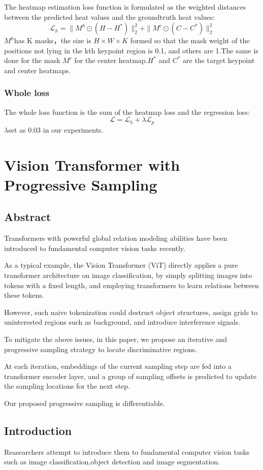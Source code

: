 \documentclass[11pt]{article}
\begin{document}
The heatmap estimation loss function is formulated as the weighted distances between the predicted heat values and the groundtruth heat values:
$$\mathcal{L}_h = \parallel M^h \odot (H - H^*)\parallel^2_2 + \parallel M^c \odot (C - C^*)\parallel^2_2$$
$M^h$has K masks，the size is $H\times W\times K$ formed so that the mask weight of the positions not lying in the kth keypoint region is 0.1, and others are 1.The same is done for the mask $M^c$
for the center heatmap.$H^*$ and $C^*$ are the target keypoint and center heatmaps.

\subsubsection{Whole loss}
The whole loss function is the sum of the heatmap loss and the regression loss:
$$\mathcal{L} = \mathcal{L}_h + \lambda\mathcal{L}_p$$
$\lambda$set as 0.03 in our experiments.

\section{Vision Transformer with Progressive Sampling}
\subsection{Abstract}
Transformers with powerful global relation modeling abilities have been introduced to fundamental computer vision tasks recently.

As a typical example, the Vision Transformer (ViT) directly applies a pure transformer architecture on image classification, by simply splitting images into tokens with a fixed length, and employing transformers to learn relations between these tokens.

However, such naive tokenization could destruct object structures, assign grids to uninterested regions such as background, and introduce interference signals. 

To mitigate the above issues, in this paper, we propose an iterative and progressive sampling
strategy to locate discriminative regions.

At each iteration, embeddings of the current sampling step are fed into a transformer encoder layer, and a group of sampling offsets is predicted to update the sampling locations for the next step.

Our proposed progressive sampling is differentiable.

\subsection{Introduction}
Reasearchers attempt to introduce them to fundamental computer vision tasks such as image classification,object detection and image segmentation.
\end{document}
